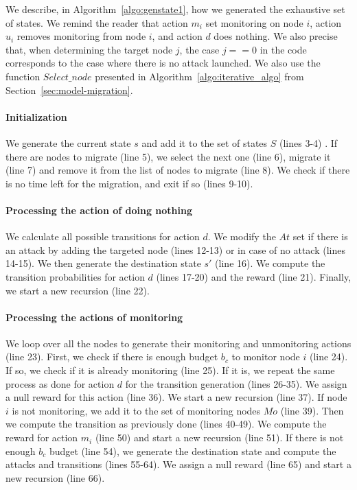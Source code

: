 
We describe, in Algorithm~\ref{algo:genstate1}, how we generated the exhaustive set of states.
We remind the reader that action $m_i$ set monitoring on node $i$, action $u_i$ removes monitoring from node $i$, and action $d$ does nothing.
We also precise that, when determining the target node $j$, the case $j==0$ in the code corresponds to the case where there is no attack launched.
We also use the function $Select\_node$ presented in Algorithm~\ref{algo:iterative_algo} from Section~\ref{sec:model-migration}.
\vspace{-4pt}
\paragraph{Initialization}
We generate the current state $s$ and add it to the set of states $S$ (lines 3-4) .
If there are nodes to migrate (line 5), we select the next one (line 6), migrate it (line 7) and remove it from the list of nodes to migrate (line 8).
We check if there is no time left for the migration, and exit if so (lines 9-10).
\vspace{-4pt}
\paragraph{Processing the action of doing nothing}
We calculate all possible transitions for action $d$.
We modify the $At$ set if there is an attack by adding the targeted node (lines 12-13) or in case of no attack (lines 14-15).
We then generate the destination state $s'$ (line 16).
We compute the transition probabilities for action $d$ (lines 17-20) and the reward (line 21).
Finally, we start a new recursion (line 22).
\vspace{-4pt}
\paragraph{Processing the actions of monitoring}
We loop over all the nodes to generate their monitoring and unmonitoring actions (line 23).
First, we check if there is enough budget $b_c$ to monitor node $i$ (line 24).
If so, we check if it is already monitoring (line 25).
If it is, we repeat the same process as done for action $d$ for the transition generation (lines 26-35).
We assign a null reward for this action (line 36).
We start a new recursion (line 37).
If node $i$ is not monitoring, we add it to the set of monitoring nodes $Mo$ (line 39).
Then we compute the transition as previously done (lines 40-49).
We compute the reward for action $m_i$ (line 50) and start a new recursion (line 51).
If there is not enough $b_c$ budget (line 54), we generate the destination state and compute the attacks and  transitions (lines 55-64).
We assign a null reward (line 65) and start a new recursion (line 66).
\vspace{-4pt}
